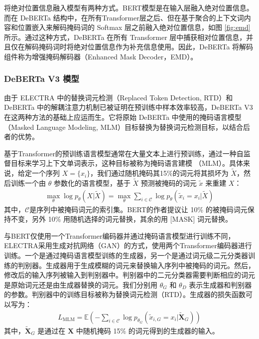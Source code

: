 将绝对位置信息融入模型有两种方式。BERT模型是在输入层融入绝对位置信息。而在 DeBERTa 结构中，在所有Transformer层之后、但在基于聚合的上下文词内容和位置嵌入来解码掩码词的 Softmax 层之前融入绝对位置信息，如图 \ref{fig:emd} 所示。通过这种方式，DeBERTa 在所有 Transformer 层中捕获相对位置信息，并且仅在解码掩码词时将绝对位置信息作为补充信息使用。因此，DeBERTa 将解码组件称为增强掩码解码器（Enhanced Mask Decoder，EMD）。

\subsubsection{DeBERTa V3 模型}

由于 ELECTRA \cite{clark2020electrapretrainingtextencoders} 中的替换词元检测（Replaced Token Detection, RTD）和 DeBERTa 中的解耦注意力机制已被证明在预训练中样本效率较高，DeBERTa V3 在这两种方法的基础上应运而生。它将原始 DeBERTa 中使用的掩码语言模型（Masked Language Modeling, MLM）目标替换为替换词元检测目标，以结合后者的优势。

基于Transformer的预训练语言模型通常在大量文本上进行预训练，通过一种自监督目标来学习上下文单词表示，这种目标被称为掩码语言建模 \cite{devlin_bert_2019}（MLM）。具体来说，给定一个序列 $X = \{x_i\}$，我们通过随机掩码其15\%的词元将其损坏为 $\tilde{X}$，然后训练一个由 $\theta$ 参数化的语言模型，基于 $\tilde{X}$ 预测被掩码的词元 $\tilde{x}$ 来重建 $X$：
\begin{align}
\max_{\theta} \log p_{\theta}(X|\tilde{X}) = \max_{\theta} \sum_{i \in \mathcal{C}} \log p_{\theta}(\tilde{x}_i = x_i|\tilde{X})
\end{align}
其中，$\mathcal{C}$是序列中被掩码词元的索引集。BERT的作者提议让 10\% 的被掩码词元保持不变，另外 10\% 用随机选择的词元替换，其余的用 [MASK] 词元替换。

与BERT仅使用一个Transformer编码器并通过掩码语言模型进行训练不同，ELECTRA采用生成对抗网络（GAN）的方式，使用两个Transformer编码器进行训练。一个是通过掩码语言模型训练的生成器，另一个是通过词元级二元分类器训练的判别器。生成器用于生成模糊的词元来替换输入序列中被掩码的词元。然后，修改后的输入序列被输入到判别器中。判别器中的二元分类器需要判断相应的词元是原始词元还是由生成器替换的词元。我们分别用 $\theta_G$ 和 $\theta_D$ 表示生成器和判别器的参数。判别器中的训练目标被称为替换词元检测（RTD）。生成器的损失函数可以写为：
\begin{align} 
L_{\text{MLM}} = \mathbb{E} \left( - \sum_{i \in \mathcal{C}} \log p_{\theta_G}(\tilde{x}_{i,G} = x_i|\tilde{\mathbf{X}}_G) \right)
\end{align}
其中，$\tilde{\mathbf{X}}_G$ 是通过在 $\mathbf{X}$ 中随机掩码 15\% 的词元得到的生成器的输入。

